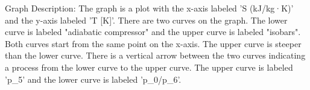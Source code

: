 Graph Description: The graph is a plot with the x-axis labeled 'S (kJ/kg·K)' and the y-axis labeled 'T [K]'. There are two curves on the graph. The lower curve is labeled "adiabatic compressor" and the upper curve is labeled "isobars". Both curves start from the same point on the x-axis. The upper curve is steeper than the lower curve. There is a vertical arrow between the two curves indicating a process from the lower curve to the upper curve. The upper curve is labeled 'p_5' and the lower curve is labeled 'p_0/p_6'.
